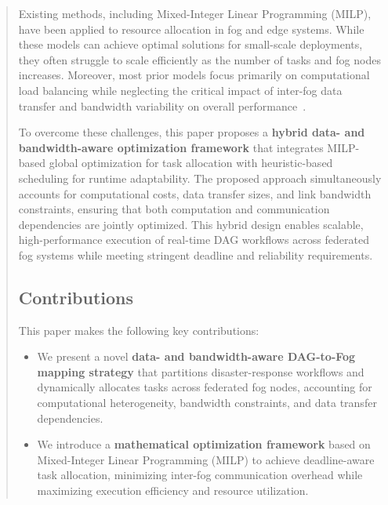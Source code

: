 \documentclass[conference]{IEEEtran}
\begin{document}
\begin{abstract}
Existing methods, including Mixed-Integer Linear Programming (MILP), have been applied to resource allocation in fog and edge systems. While these models can achieve optimal solutions for small-scale deployments, they often struggle to scale efficiently as the number of tasks and fog nodes increases. Moreover, most prior models focus primarily on computational load balancing while neglecting the critical impact of inter-fog data transfer and bandwidth variability on overall performance~\cite{mattia2023fogcontrol}.

To overcome these challenges, this paper proposes a \textbf{hybrid data- and bandwidth-aware optimization framework} that integrates MILP-based global optimization for task allocation with heuristic-based scheduling for runtime adaptability. The proposed approach simultaneously accounts for computational costs, data transfer sizes, and link bandwidth constraints, ensuring that both computation and communication dependencies are jointly optimized. This hybrid design enables scalable, high-performance execution of real-time DAG workflows across federated fog systems while meeting stringent deadline and reliability requirements.



\subsection{Contributions}

This paper makes the following key contributions:

\begin{itemize}
    \item We present a novel \textbf{data- and bandwidth-aware DAG-to-Fog mapping strategy} that partitions disaster-response workflows and dynamically allocates tasks across federated fog nodes, accounting for computational heterogeneity, bandwidth constraints, and data transfer dependencies.
    
    \item We introduce a \textbf{mathematical optimization framework} based on Mixed-Integer Linear Programming (MILP) to achieve deadline-aware task allocation, minimizing inter-fog communication overhead while maximizing execution efficiency and resource utilization.
    

\end{itemize}
\end{abstract}
\end{document}

